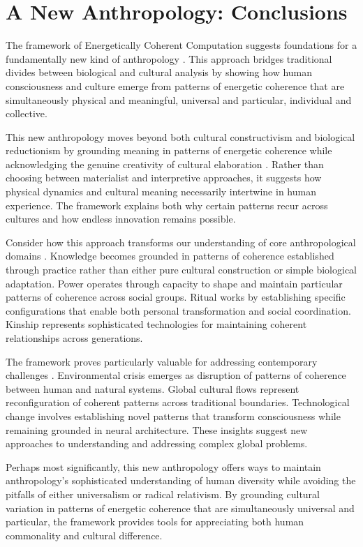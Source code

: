 \section{A New Anthropology: Conclusions}

The framework of Energetically Coherent Computation suggests foundations for a fundamentally new kind of anthropology \cite{rabinow2008marking}. This approach bridges traditional divides between biological and cultural analysis by showing how human consciousness and culture emerge from patterns of energetic coherence that are simultaneously physical and meaningful, universal and particular, individual and collective.

This new anthropology moves beyond both cultural constructivism and biological reductionism by grounding meaning in patterns of energetic coherence while acknowledging the genuine creativity of cultural elaboration \cite{strathern2004commons}. Rather than choosing between materialist and interpretive approaches, it suggests how physical dynamics and cultural meaning necessarily intertwine in human experience. The framework explains both why certain patterns recur across cultures and how endless innovation remains possible.

Consider how this approach transforms our understanding of core anthropological domains \cite{fischer2018anthropology}. Knowledge becomes grounded in patterns of coherence established through practice rather than either pure cultural construction or simple biological adaptation. Power operates through capacity to shape and maintain particular patterns of coherence across social groups. Ritual works by establishing specific configurations that enable both personal transformation and social coordination. Kinship represents sophisticated technologies for maintaining coherent relationships across generations.

The framework proves particularly valuable for addressing contemporary challenges \cite{latour2017facing}. Environmental crisis emerges as disruption of patterns of coherence between human and natural systems. Global cultural flows represent reconfiguration of coherent patterns across traditional boundaries. Technological change involves establishing novel patterns that transform consciousness while remaining grounded in neural architecture. These insights suggest new approaches to understanding and addressing complex global problems.

Perhaps most significantly, this new anthropology offers ways to maintain anthropology's sophisticated understanding of human diversity \cite{moore2011still} while avoiding the pitfalls of either universalism or radical relativism. By grounding cultural variation in patterns of energetic coherence that are simultaneously universal and particular, the framework provides tools for appreciating both human commonality and cultural difference.


